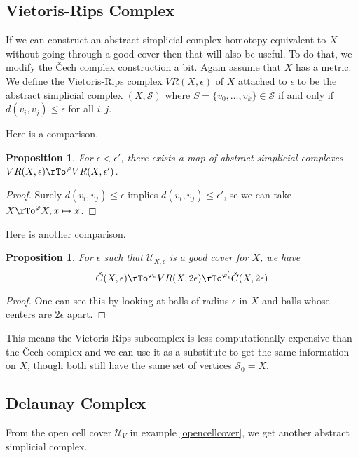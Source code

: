 \documentclass[12pt]{amsart}
\newtheorem{proposition}[theorem]{Proposition}
\theoremstyle{definition}
\begin{document}
\subsection{Vietoris-Rips Complex}\label{Vietoris-Ripscomplex} If we can construct an abstract simplicial complex homotopy equivalent to $X$ without going through a good cover then that will also be useful. To do that, we modify the \v{C}ech complex construction a bit. Again assume that $X$ has a metric.
\dfn We define the Vietoris-Rips complex $VR(X, \epsilon)$ of $X$ attached to $\epsilon$ to be the abstract simplicial complex $(X, \mathcal{S})$ where $S = \{v_0, \dots , v_k\} \in \mathcal{S}$ if and only if $d(v_i, v_j) \leq \epsilon$ for all $i, j$.

Here is a comparison.
\begin{proposition}\label{mapofVietoris-Ripscomplexes} For $\epsilon < \epsilon'$, there exists a map of abstract simplicial complexes $VR(X, \epsilon) \rTo^{\varphi} VR(X, \epsilon')$.
\end{proposition}
\begin{proof} Surely $d(v_i, v_j) \leq \epsilon$ implies $d(v_i, v_j) \leq \epsilon'$, se we can take $X \rTo^{\varphi} X, x \mapsto x$.
\end{proof}

Here is another comparison.
\begin{proposition}\label{mapsofCechcomplexVietoris-Ripscomplex} For $\epsilon$ such that $\mathcal{U}_{X, \epsilon}$ is a good cover for $X$, we have
$$\check{C}(X, \epsilon) \rTo^{\varphi_{\epsilon}} VR(X, 2\epsilon) \rTo^{\varphi_{\epsilon}'} \check{C}(X, 2\epsilon)$$
\end{proposition}
\begin{proof} One can see this by looking at balls of radius $\epsilon$ in $X$ and balls whose centers are $2\epsilon$ apart.
\end{proof}

This means the Vietoris-Rips subcomplex is less computationally expensive than the \v{C}ech complex and we can use it as a substitute to get the same information on $X$, though both still have the same set of vertices $\mathcal{S}_0 = X$.

\subsection{Delaunay Complex} From the open cell cover $\mathcal{U}_V$ in example \ref{opencellcover}, we get another abstract simplicial complex.
\end{document}
